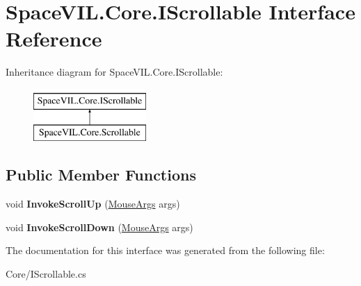 \hypertarget{interface_space_v_i_l_1_1_core_1_1_i_scrollable}{}\section{Space\+V\+I\+L.\+Core.\+I\+Scrollable Interface Reference}
\label{interface_space_v_i_l_1_1_core_1_1_i_scrollable}
Inheritance diagram for Space\+V\+I\+L.\+Core.\+I\+Scrollable\+:\begin{figure}[H]
\begin{center}
\leavevmode
\includegraphics[height=2.000000cm]{interface_space_v_i_l_1_1_core_1_1_i_scrollable}
\end{center}
\end{figure}
\subsection*{Public Member Functions}
\begin{DoxyCompactItemize}
\item 
\mbox{\label{interface_space_v_i_l_1_1_core_1_1_i_scrollable_a44ae05db99f66bd81bddedd6384d1212}} 
void {\bfseries Invoke\+Scroll\+Up} (\mbox{\hyperlink{class_space_v_i_l_1_1_core_1_1_mouse_args}{Mouse\+Args}} args)
\item 
\mbox{\label{interface_space_v_i_l_1_1_core_1_1_i_scrollable_a2fe7e5369638660ef8e793c1981e7047}} 
void {\bfseries Invoke\+Scroll\+Down} (\mbox{\hyperlink{class_space_v_i_l_1_1_core_1_1_mouse_args}{Mouse\+Args}} args)
\end{DoxyCompactItemize}


The documentation for this interface was generated from the following file\+:\begin{DoxyCompactItemize}
\item 
Core/I\+Scrollable.\+cs\end{DoxyCompactItemize}
